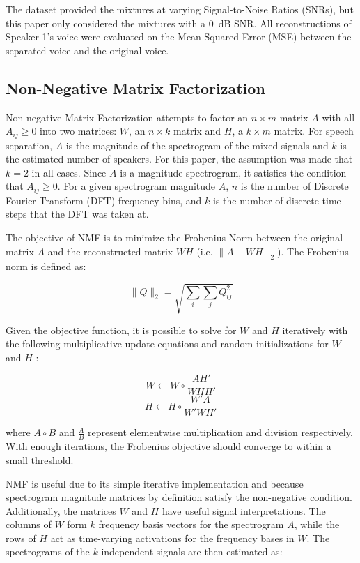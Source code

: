 \documentclass[12pt,chapterheads]{ucsd}
\begin{document}
The dataset provided the mixtures at varying Signal-to-Noise Ratios (SNRs), but this paper only considered the mixtures with a \mbox{0 dB} SNR. All reconstructions of Speaker 1's voice were evaluated on the Mean Squared Error (MSE) between the separated voice and the original voice.

\subsection{Non-Negative Matrix Factorization}
Non-negative Matrix Factorization attempts to factor an $n \times m$ matrix $A$ with all $A_{ij} \geq 0$ into two matrices: $W$, an $n \times k$ matrix and $H$, a $k \times m$ matrix. For speech separation, $A$ is the magnitude of the spectrogram of the mixed signals and $k$ is the estimated number of speakers. For this paper, the assumption was made that $k=2$ in all cases. Since $A$ is a magnitude spectrogram, it satisfies the condition that $A_{ij} \geq 0$. For a given spectrogram magnitude $A$, $n$ is the number of Discrete Fourier Transform (DFT) frequency bins, and $k$ is the number of discrete time steps that the DFT was taken at.

The objective of NMF is to minimize the Frobenius Norm between the original matrix $A$ and the reconstructed matrix $WH$ (i.e. $\| A - WH\|_2$). The Frobenius norm is defined as:

\begin{equation}
\| Q \|_2 = \sqrt{\sum\limits_{i} \sum\limits_{j} Q_{ij}^2}
\end{equation}

Given the objective function, it is possible to solve for $W$ and $H$ iteratively with the following multiplicative update equations and random initializations for $W$ and $H$ \cite{Lee00algorithmsfor}:

\begin{equation}
W \leftarrow W \circ \frac{AH'}{WHH'}
\end{equation}
\begin{equation}
H \leftarrow H \circ \frac{W'A}{W'WH'}
\end{equation}

where $A \circ B$ and $\frac{A}{B}$ represent elementwise multiplication and division respectively. With enough iterations, the Frobenius objective should converge to within a small threshold.

NMF is useful due to its simple iterative implementation and because spectrogram magnitude matrices by definition satisfy the non-negative condition.  Additionally, the matrices $W$ and $H$ have useful signal interpretations. The columns of $W$ form $k$ frequency basis vectors for the spectrogram $A$, while the rows of $H$ act as time-varying activations for the frequency bases in $W$. The spectrograms of the $k$ independent signals are then estimated as:
\end{document}
